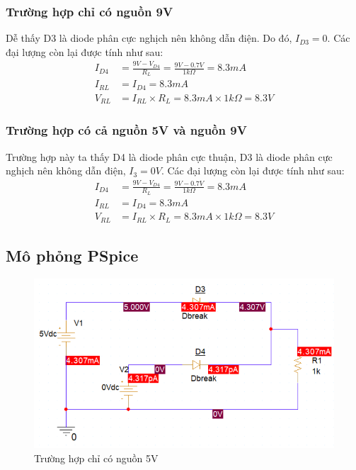 \subsubsection{Trường hợp chỉ có nguồn 9V}
Dễ thấy D3 là diode phân cực nghịch nên không dẫn điện. Do đó, \(I_{D3} = 0\). Các đại lượng còn lại được tính như sau:
\begin{align*}
I_{D4} &= \frac{9V - V_{D4}}{R_{L}} = \frac{9V - 0.7V}{1k\Omega} = 8.3mA\\
I_{RL} &= I_{D4} = 8.3mA \\
V_{RL} &= I_{RL} \times R_{L} = 8.3mA \times 1k\Omega = 8.3V
\end{align*}

\subsubsection{Trường hợp có cả nguồn 5V và nguồn 9V}
Trường hợp này ta thấy D4 là diode phân cực thuận, D3 là diode phân cực nghịch nên không dẫn điện, \(I_{3} = 0V\). Các đại lượng còn lại được tính như sau:
\begin{align*}
I_{D4} &= \frac{9V - V_{D4}}{R_{L}} = \frac{9V - 0.7V}{1k\Omega} = 8.3mA\\
I_{RL} &= I_{D4} = 8.3mA \\
V_{RL} &= I_{RL} \times R_{L} = 8.3mA \times 1k\Omega = 8.3V
\end{align*}

\subsection{Mô phỏng PSpice}
\begin{figure}[H]
    \centering
    \includegraphics[width=1\textwidth]{graphics/ex5/f2.png}
    \caption{Trường hợp chỉ có nguồn 5V}
\end{figure}

